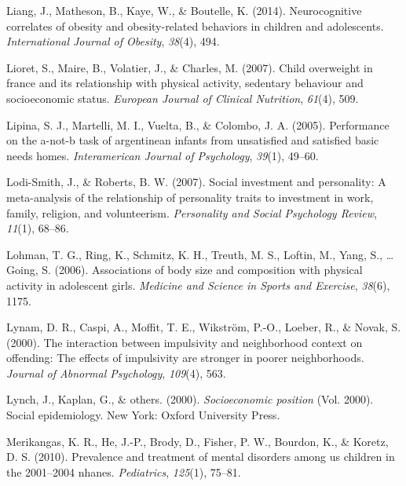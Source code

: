 \documentclass[man]{apa6}
\begin{document}
\leavevmode\hypertarget{ref-liang2014neurocognitive}{}%
Liang, J., Matheson, B., Kaye, W., \& Boutelle, K. (2014). Neurocognitive correlates of obesity and obesity-related behaviors in children and adolescents. \emph{International Journal of Obesity}, \emph{38}(4), 494.

\leavevmode\hypertarget{ref-lioret2007child}{}%
Lioret, S., Maire, B., Volatier, J., \& Charles, M. (2007). Child overweight in france and its relationship with physical activity, sedentary behaviour and socioeconomic status. \emph{European Journal of Clinical Nutrition}, \emph{61}(4), 509.

\leavevmode\hypertarget{ref-lipina2005performance}{}%
Lipina, S. J., Martelli, M. I., Vuelta, B., \& Colombo, J. A. (2005). Performance on the a-not-b task of argentinean infants from unsatisfied and satisfied basic needs homes. \emph{Interamerican Journal of Psychology}, \emph{39}(1), 49--60.

\leavevmode\hypertarget{ref-lodi2007social}{}%
Lodi-Smith, J., \& Roberts, B. W. (2007). Social investment and personality: A meta-analysis of the relationship of personality traits to investment in work, family, religion, and volunteerism. \emph{Personality and Social Psychology Review}, \emph{11}(1), 68--86.

\leavevmode\hypertarget{ref-lohman2006associations}{}%
Lohman, T. G., Ring, K., Schmitz, K. H., Treuth, M. S., Loftin, M., Yang, S., \ldots{} Going, S. (2006). Associations of body size and composition with physical activity in adolescent girls. \emph{Medicine and Science in Sports and Exercise}, \emph{38}(6), 1175.

\leavevmode\hypertarget{ref-lynam2000interaction}{}%
Lynam, D. R., Caspi, A., Moffit, T. E., Wikström, P.-O., Loeber, R., \& Novak, S. (2000). The interaction between impulsivity and neighborhood context on offending: The effects of impulsivity are stronger in poorer neighborhoods. \emph{Journal of Abnormal Psychology}, \emph{109}(4), 563.

\leavevmode\hypertarget{ref-lynch2000socioeconomic}{}%
Lynch, J., Kaplan, G., \& others. (2000). \emph{Socioeconomic position} (Vol. 2000). Social epidemiology. New York: Oxford University Press.

\leavevmode\hypertarget{ref-merikangas2010prevalence}{}%
Merikangas, K. R., He, J.-P., Brody, D., Fisher, P. W., Bourdon, K., \& Koretz, D. S. (2010). Prevalence and treatment of mental disorders among us children in the 2001--2004 nhanes. \emph{Pediatrics}, \emph{125}(1), 75--81.
\end{document}
